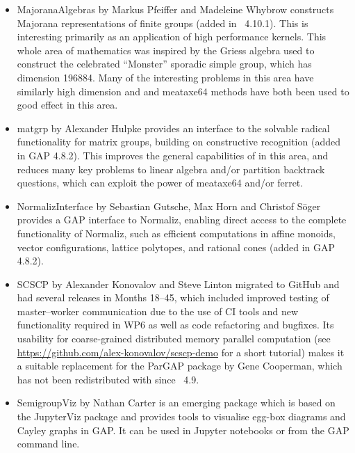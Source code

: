 \begin{itemize}
\item
{\sf MajoranaAlgebras} by Markus Pfeiffer and Madeleine Whybrow \cite{MajoranaAlgebras}
constructs Majorana representations of finite groups (added in
\GAP~4.10.1). This is interesting primarily as an application of high
performance kernels. This whole area of mathematics was inspired by
the Griess algebra used to construct the celebrated ``Monster''
sporadic simple group, which has dimension 196884. Many of the
interesting problems in this area have similarly high dimension and
\HPCGAP and meataxe64 methods have both been used to good effect in
this area.
%
%

\item
{\sf matgrp}  by Alexander Hulpke \cite{matgrp} provides an interface
to the solvable radical functionality for matrix groups, building on
constructive recognition (added in GAP 4.8.2). This improves the
general capabilities of \GAP in this area, and reduces many key
problems to linear algebra and/or partition backtrack questions, which
can exploit the power of {\sf meataxe64} and/or {\sf ferret}.

\item
{\sf NormalizInterface} by Sebastian Gutsche, Max Horn and
Christof S\"oger \cite{NormalizInterface} provides a GAP interface to Normaliz, enabling
direct access to the complete functionality of Normaliz, such as efficient
computations in affine monoids, vector configurations, lattice
polytopes, and rational cones (added in GAP 4.8.2). 

\item
{\sf SCSCP} by Alexander Konovalov and Steve Linton \cite{SCSCP}
migrated to GitHub and had several releases
in Months 18--45, which included improved testing of 
master--worker communication due to the use of
CI tools and new functionality required in WP6 as well as
code refactoring and bugfixes. Its usability for 
coarse-grained distributed memory parallel computation
(see \url{https://github.com/alex-konovalov/scscp-demo}
for a short tutorial) makes it a suitable replacement for the {\sf ParGAP}
package by Gene Cooperman, which has not been redistributed 
with \GAP since \GAP~4.9.

\item
{\sf SemigroupViz} by Nathan Carter \cite{SemigroupViz} is an emerging
package which is based on the {\sf JupyterViz} package \cite{JupyterViz}
and provides tools to visualise egg-box diagrams and Cayley graphs in
GAP. It can be used in Jupyter notebooks or from the GAP command line.
%
%


\end{itemize}
